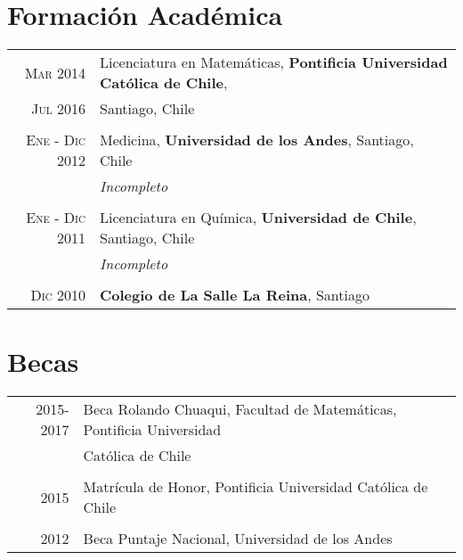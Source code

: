 \documentclass[a4paper,10pt]{article}
\begin{document}
\section{Formación Académica}
\begin{tabular}{rl}
\textsc{Mar 2014}
	& Licenciatura en Matemáticas, \textbf{Pontificia Universidad Católica de Chile},\\
\textsc{Jul 2016	}
	& Santiago, Chile\\

	&\\
	
\textsc{Ene - Dic} 2012
	& Medicina, \textbf{Universidad de los Andes}, Santiago, Chile \\
	&\emph{Incompleto}\\
	
	&\\
		
\textsc{Ene - Dic} 2011
	& Licenciatura en Química, \textbf{Universidad de Chile}, Santiago, Chile \\
	&\emph{Incompleto}\\
	
	&\\

\textsc{Dic} 2010
	& \textbf{Colegio de La Salle La Reina}, Santiago
\end{tabular}

\section{Becas}
\begin{tabular}{rl}
\textsc{2015-2017} 
	&	Beca Rolando Chuaqui, Facultad de Matemáticas, Pontificia Universidad 	\\
	&	Católica de Chile	\\
	&	\\
	
\textsc{2015}
	&	Matrícula de Honor, Pontificia Universidad Católica de Chile	\\
	&	\\
	
\textsc{2012}
	&	Beca Puntaje Nacional, Universidad de los Andes	\\
	
\end{tabular}

\end{document}
